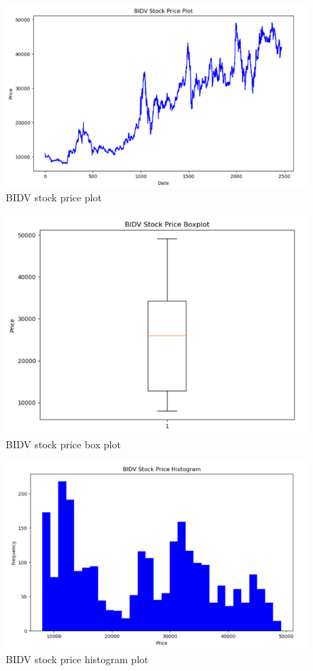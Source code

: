 \documentclass{ieeeojies}
\begin{document}
\begin{figure}[H]
    \centering
    \includegraphics[width=1\linewidth]{BIDV_plot.png}
    \caption{BIDV stock price plot}
    \label{fig:enter-label}
\end{figure}
\begin{figure}[H]
    \centering
    \includegraphics[width=1\linewidth]{BIDV_box.png}
    \caption{BIDV stock price box plot}
    \label{fig:enter-label}
\end{figure}
\begin{figure}[H]
    \centering
    \includegraphics[width=1\linewidth]{BIDV_histogram.png}
    \caption{BIDV stock price histogram plot}
    \label{fig:enter-label}
\end{figure}
\end{document}

